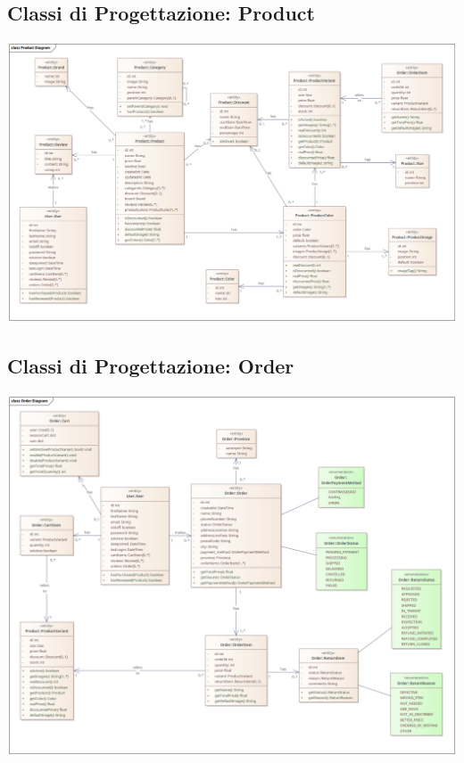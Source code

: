 \subsection{Classi di Progettazione: Product}
\begin{center}
  \includegraphics[width=\textwidth]{immagini/Progettazione/ClassDiagrams/Product.png}
\end{center}

\subsection{Classi di Progettazione: Order}
\begin{center}
  \includegraphics[width=\textwidth]{immagini/Progettazione/ClassDiagrams/Order.png}
\end{center}

